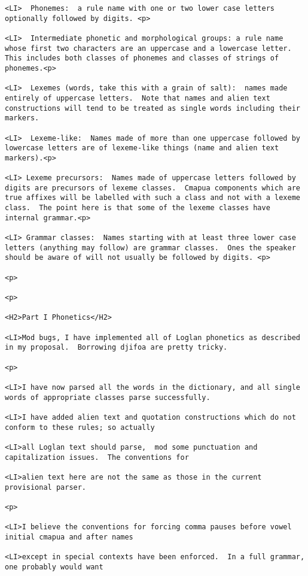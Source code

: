 \documentclass[12pt]{article}
\begin{document}
\begin{lstlisting}
<LI>  Phonemes:  a rule name with one or two lower case letters optionally followed by digits. <p>

<LI>  Intermediate phonetic and morphological groups: a rule name whose first two characters are an uppercase and a lowercase letter.  This includes both classes of phonemes and classes of strings of phonemes.<p>

<LI>  Lexemes (words, take this with a grain of salt):  names made entirely of uppercase letters.  Note that names and alien text constructions will tend to be treated as single words including their markers.

<LI>  Lexeme-like:  Names made of more than one uppercase followed by lowercase letters are of lexeme-like things (name and alien text markers).<p>

<LI> Lexeme precursors:  Names made of uppercase letters followed by digits are precursors of lexeme classes.  Cmapua components which are true affixes will be labelled with such a class and not with a lexeme class.  The point here is that some of the lexeme classes have internal grammar.<p>

<LI> Grammar classes:  Names starting with at least three lower case letters (anything may follow) are grammar classes.  Ones the speaker should be aware of will not usually be followed by digits. <p>

<p>

<p>

<H2>Part I Phonetics</H2>

<LI>Mod bugs, I have implemented all of Loglan phonetics as described in my proposal.  Borrowing djifoa are pretty tricky.

<p>

<LI>I have now parsed all the words in the dictionary, and all single words of appropriate classes parse successfully.

<LI>I have added alien text and quotation constructions which do not conform to these rules; so actually

<LI>all Loglan text should parse,  mod some punctuation and capitalization issues.  The conventions for

<LI>alien text here are not the same as those in the current provisional parser.

<p>

<LI>I believe the conventions for forcing comma pauses before vowel initial cmapua and after names

<LI>except in special contexts have been enforced.  In a full grammar, one probably would want


\end{lstlisting}
\end{document}
